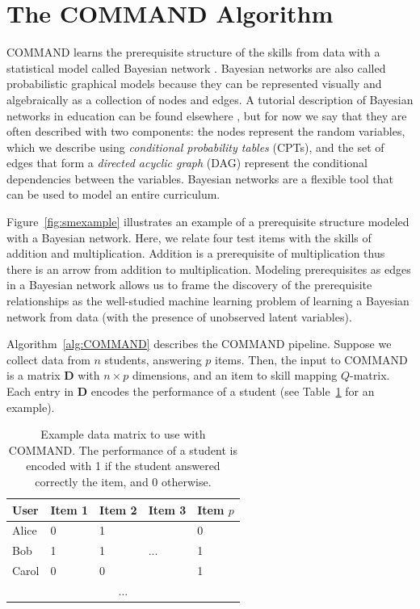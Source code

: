 \documentclass{edm_template}
\begin{document}
\section{The COMMAND Algorithm}
\label{sec:pre_pipeline}
COMMAND learns the prerequisite structure of the skills from data with a statistical model called Bayesian network \cite{pearl2000causality,spirtes2001causation}.
Bayesian networks are also called probabilistic graphical models  because they can  be represented visually and algebraically as a collection of nodes and edges.
A tutorial description of Bayesian networks in education can be found elsewhere \cite{almond2015bayesian}, 
but for now we say that they are often described with two components: 
the  nodes represent the random variables, which we describe using \textit{conditional probability tables} (CPTs),
and the set of edges that form a \textit{directed acyclic graph} (DAG) represent the conditional dependencies between the variables.
Bayesian networks are a flexible tool that can be used to model an entire curriculum.

Figure~\ref{fig:smexample} illustrates an example of a prerequisite structure modeled with a Bayesian network.
Here, we relate four test items with the skills of addition and multiplication.
Addition is a prerequisite of multiplication thus there is an arrow from addition to multiplication.
Modeling prerequisites as edges in a Bayesian network allows us to frame the discovery of the prerequisite relationships as the well-studied machine learning problem of
learning a Bayesian network from data (with the presence of unobserved latent variables).


Algorithm~\ref{alg:COMMAND} describes the COMMAND pipeline.
Suppose we collect data from  $n$ students, answering $p$ items.
Then, the input to COMMAND is a matrix $\mathbf{D}$ with $n \times p$ dimensions, and an item to skill mapping $Q$-matrix.
Each entry in $\mathbf{D}$ encodes the performance of a student (see Table~\ref{tbl:d-matrix} for an example).


\begin{table}[htb]%
	\centering
	\caption{Example data matrix to use with COMMAND.  The performance of a student is encoded with 1 if the student answered correctly the item, and 0 otherwise. \label{tbl:d-matrix}}
	\begin{tabular}{@{}lllll@{}}
		\toprule
		User  & Item 1 & Item 2 & Item 3 & Item $p$ \\ \midrule
		Alice & 0      & 1      &        & 0        \\
		Bob   & 1      & 1      & ...    & 1        \\
		Carol & 0      & 0      &        & 1        \\
		\multicolumn{5}{c}{...}                     \\ \bottomrule
	\end{tabular}
\end{table}
\end{document}
